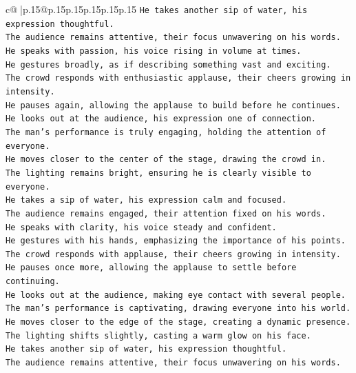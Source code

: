 \documentclass{article}
\begin{document}
{\begin{supertabular}{c@{$\;$}|p{.15\linewidth}@{}p{.15\linewidth}p{.15\linewidth}p{.15\linewidth}p{.15\linewidth}p{.15\linewidth}}
{{{\texttt{He takes another sip of water, his expression thoughtful.  } \\
\texttt{The audience remains attentive, their focus unwavering on his words.  } \\
\texttt{He speaks with passion, his voice rising in volume at times.  } \\
\texttt{He gestures broadly, as if describing something vast and exciting.  } \\
\texttt{The crowd responds with enthusiastic applause, their cheers growing in intensity.  } \\
\texttt{He pauses again, allowing the applause to build before he continues.  } \\
\texttt{He looks out at the audience, his expression one of connection.  } \\
\texttt{The man's performance is truly engaging, holding the attention of everyone.  } \\
\texttt{He moves closer to the center of the stage, drawing the crowd in.  } \\
\texttt{The lighting remains bright, ensuring he is clearly visible to everyone.  } \\
\texttt{He takes a sip of water, his expression calm and focused.  } \\
\texttt{The audience remains engaged, their attention fixed on his words.  } \\
\texttt{He speaks with clarity, his voice steady and confident.  } \\
\texttt{He gestures with his hands, emphasizing the importance of his points.  } \\
\texttt{The crowd responds with applause, their cheers growing in intensity.  } \\
\texttt{He pauses once more, allowing the applause to settle before continuing.  } \\
\texttt{He looks out at the audience, making eye contact with several people.  } \\
\texttt{The man's performance is captivating, drawing everyone into his world.  } \\
\texttt{He moves closer to the edge of the stage, creating a dynamic presence.  } \\
\texttt{The lighting shifts slightly, casting a warm glow on his face.  } \\
\texttt{He takes another sip of water, his expression thoughtful.  } \\
\texttt{The audience remains attentive, their focus unwavering on his words.  } \\
}}}
\end{supertabular}}
\end{document}

